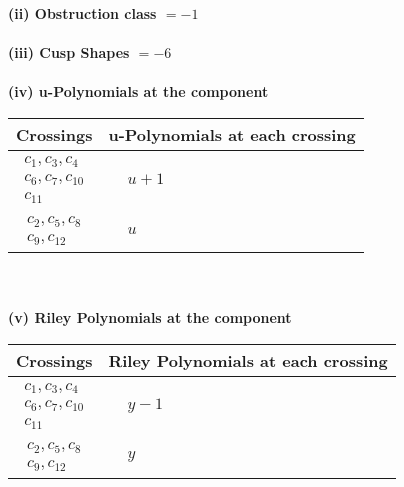 \documentclass[1p]{elsarticle_modified}
\theoremstyle{definition}
\begin{document}
\flushleft \textbf{(ii) Obstruction class $= -1$}\\~\\
\flushleft \textbf{(iii) Cusp Shapes $= -6$}\\~\\
\newpage\renewcommand{\arraystretch}{1}
\flushleft \textbf{(iv) u-Polynomials at the component}\newline \\
\begin{tabular}{m{50pt}|m{274pt}}
Crossings & \hspace{64pt}u-Polynomials at each crossing \\
\hline $$\begin{aligned}c_{1},c_{3},c_{4}\\c_{6},c_{7},c_{10}\\c_{11}\end{aligned}$$&$\begin{aligned}
&u+1
\end{aligned}$\\
\hline $$\begin{aligned}c_{2},c_{5},c_{8}\\c_{9},c_{12}\end{aligned}$$&$\begin{aligned}
&u
\end{aligned}$\\
\hline
\end{tabular}\\~\\
\newpage\renewcommand{\arraystretch}{1}
\flushleft \textbf{(v) Riley Polynomials at the component}\newline \\
\begin{tabular}{m{50pt}|m{274pt}}
Crossings & \hspace{64pt}Riley Polynomials at each crossing \\
\hline $$\begin{aligned}c_{1},c_{3},c_{4}\\c_{6},c_{7},c_{10}\\c_{11}\end{aligned}$$&$\begin{aligned}
&y-1
\end{aligned}$\\
\hline $$\begin{aligned}c_{2},c_{5},c_{8}\\c_{9},c_{12}\end{aligned}$$&$\begin{aligned}
&y
\end{aligned}$\\
\hline
\end{tabular}\\~\\
\end{document}
